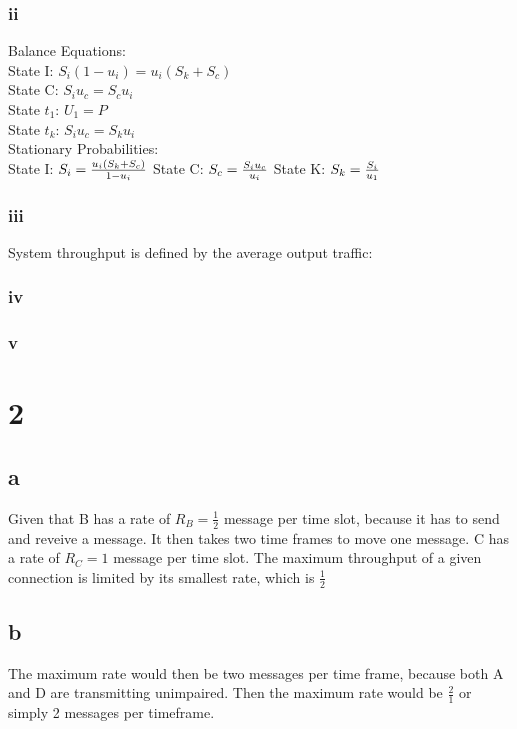 \documentclass[10pt,letterpaper]{article}
\begin{document}
\subsubsection*{ii}
Balance Equations:\\
State I: $S_i(1-u_i)=u_i(S_k+S_c)$\\
State C: $S_iu_c=S_cu_i$\\
State $t_1$: $U_1 = P$ \\
State $t_k$: $S_iu_c=S_ku_i$ \\

Stationary Probabilities:\\

State I: $S_i=\frac{u_i(S_k+S_c)}{1-u_i}\\$
State C: $S_c=\frac{S_iu_c}{u_i}\\$
State K: $S_k=\frac{S_i}{u_1}\\$

\subsubsection*{iii}
System throughput is defined by the average output traffic:\\

\subsubsection*{iv}
\subsubsection*{v}

\section*{2}
\subsection*{a}
Given that B has a rate of $R_B=\frac{1}{2}$ message per time slot, because it
has to send and reveive a message. It then takes two time frames to move one 
message. C has a rate of $R_C = 1$ message per time slot.
The maximum throughput of a given connection is limited by its smallest rate,
which is $\frac{1}{2}$

\subsection*{b}
The maximum rate would then be two messages per time frame, because both A
and D are transmitting unimpaired. Then the maximum rate would be $\frac{2}{1}$
or simply 2 messages per timeframe.
\end{document}
